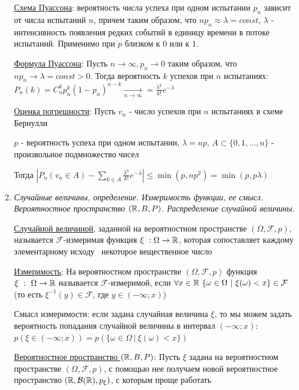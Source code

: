 \documentclass[12pt]{article}
\begin{document}
\begin{enumerate}
    \hyperlink{poissonschema}{Схема Пуассона}: вероятность числа успеха при одном испытании $p_n$ зависит от числа испытаний $n$, причем таким образом, что $n p_n \approx \lambda = const$, 
    $\lambda$ - интенсивность появления редких событий в единицу времени в потоке испытаний. Применимо при $p$ близком к 0 или к 1.

    \hyperlink{poissonformula}{Формула Пуассона}: \Ths Пусть $n \to \infty, p_n \to 0$ таким образом, что $n p_n \to \lambda = const > 0$.
    Тогда вероятность $k$ успехов при $n$ испытаниях: $P_n(k) = C^k_n p_n^k (1 - p_n)^{n - k} \underset{n \to \infty}{\rightarrow} = \frac{\lambda^k}{k!} e^{-\lambda}$

    \hyperlink{errorinpoissonformula}{Оценка погрешности}: \Ths Пусть $v_n$ - число успехов при $n$ испытаниях в схеме Бернулли

    $p$ - вероятность успеха при одном испытании, $\lambda = np$, $A \subset \{0, 1, \dots, n\}$ - произвольное подмножество чисел

    Тогда $|P_n (v_n \in A) - \sum_{k \in A} \frac{\lambda^k}{k!} e^{-\lambda}| \leq \min (p, np^2) = \min (p, p\lambda)$

    \item \textit{Случайные величины, определение. Измеримость функции, ее смысл. Вероятностное пространство $(\mathbb{R}, B, P)$. Распределение случайной величины.}

    \hyperlink{randomvaluedefinition}{Случайной величиной}, заданной на вероятностном пространстве $(\Omega, \mathcal{F}, p)$, называется
    $\mathcal{F}$-измеримая функция $\xi \ : \Omega \to \mathbb{R}$, которая сопоставляет каждому элементарному исходу \
    некоторое вещественное число

    \hyperlink{measurabilityoffunction}{Измеримость}: На вероятностном пространстве $(\Omega, \mathcal{F}, p)$ функция $\xi \ : \ \Omega \to \mathbb{R}$ называется
    $\mathcal{F}$-измеримой, если $\forall x \in \mathbb{R} \ \{\omega \in \Omega \ | \ \xi(\omega) < x\} \in \mathcal{F}$
    (то есть $\xi^{-1}(y) \in \mathcal{F}$, где $y \in (-\infty; x)$)

    Смысл измеримости: если задана случайная величина $\xi$, то мы можем задать вероятность попадания случайной
    величины в интервал $(-\infty; x)$: $p(\xi \in (-\infty; x)) = p(\{\omega \in \Omega \ | \ \xi(\omega) < x\})$

    \hyperlink{probabilityspacerbp}{Вероятностное пространство $(\mathbb{R}, B, P)$}: Пусть $\xi$ задана на вероятностном пространстве $(\Omega, \mathcal{F}, p)$, с помощью нее получаем новой вероятностное
    пространство $(\mathbb{R}, \mathcal{B}(\mathbb{R}), p_\xi)$, с которым проще работать


\end{enumerate}
\end{document}
